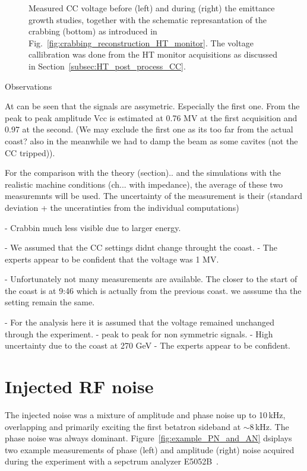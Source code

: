 \begin{figure}[!ht]
\begin{subfigure}[t]{0.45\textwidth}
    \end{subfigure}
    \hfill
     \caption{Measured CC voltage before (left) and during (right) the emittance growth studies, together with the schematic represantation of the crabbing (bottom) as introduced in Fig.~\ref{fig:crabbing_reconstruction_HT_monitor}. The voltage callibration was done from the HT monitor acquisitions as discussed in Section~\ref{subsec:HT_post_process_CC}. }
     \label{fig:VCC_MD5_2018} 
\end{figure}

Observations 



At can be seen that the signals are assymetric. Especially the first one. From the peak to peak amplitude Vcc is estimated at 0.76 MV at the first acquisition and 0.97 at the second. (We may exclude the first one as its too far from the actual coast? also in the meanwhile we had to damp the beam as some cavites (not the CC tripped)). 

For the comparison with the theory (section).. and the simulations with the realistic machine conditions (ch... with impedance), the average of these two measuremnts will be used. The uncertainty of the measurement is their (standard deviation + the unceratinties from the individual computations)

- Crabbin much less visible due to larger energy.

- We assumed that the CC settings didnt change throught the coast.
- The experts appear to be confident that the voltage was 1 MV.


- Unfortunately not many measurements are available. The closer to the start of the coast is at 9:46 which is actually from the previous coast. we asssume tha the setting remain the same.


- For the analysis here it is assumed that the voltage remained unchanged through the experiment. 
- peak to peak for non symmetric signals.
- High uncertainty due to the coast at 270 GeV
- The experts appear to be confident.

\section{Injected RF noise}\label{sec:noise_meas2018}
\begin{sloppypar} %
 The injected noise was a mixture of amplitude and phase noise up to 10\,kHz, overlapping and primarily exciting the first betatron sideband at $\sim 8$\,kHz. The phase noise was always dominant. Figure~\ref{fig:example_PN_and_AN} dsiplays two example measurements of phase (left) and amplitude (right) noise acquired during the experiment with a sepctrum analyzer E5052B~\cite{E5052B_insight}. 
\end{sloppypar} 


